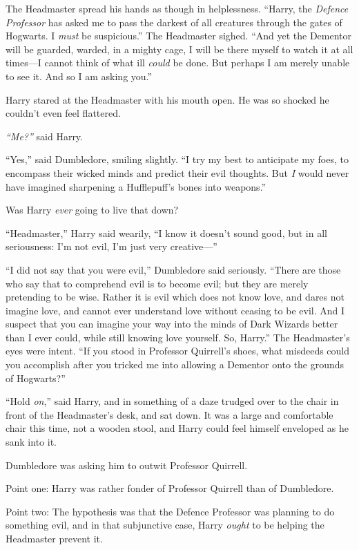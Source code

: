The Headmaster spread his hands as though in helplessness. ``Harry, the
\emph{Defence Professor} has asked me to pass the darkest of all
creatures through the gates of Hogwarts. I \emph{must} be suspicious.''
The Headmaster sighed. ``And yet the Dementor will be guarded, warded,
in a mighty cage, I will be there myself to watch it at all times---I
cannot think of what ill \emph{could} be done. But perhaps I am merely
unable to see it. And so I am asking you.''

Harry stared at the Headmaster with his mouth open. He was so shocked he
couldn't even feel flattered.

\emph{``Me?''} said Harry.

``Yes,'' said Dumbledore, smiling slightly. ``I try my best to
anticipate my foes, to encompass their wicked minds and predict their
evil thoughts. But \emph{I} would never have imagined sharpening a
Hufflepuff's bones into weapons.''

Was Harry \emph{ever} going to live that down?

``Headmaster,'' Harry said wearily, ``I know it doesn't sound good, but
in all seriousness: I'm not evil, I'm just very creative---''

``I did not say that you were evil,'' Dumbledore said seriously. ``There
are those who say that to comprehend evil is to become evil; but they
are merely pretending to be wise. Rather it is evil which does not know
love, and dares not imagine love, and cannot ever understand love
without ceasing to be evil. And I suspect that you can imagine your way
into the minds of Dark Wizards better than I ever could, while still
knowing love yourself. So, Harry.'' The Headmaster's eyes were intent.
``If you stood in Professor Quirrell's shoes, what misdeeds could you
accomplish after you tricked me into allowing a Dementor onto the
grounds of Hogwarts?''

``Hold \emph{on},'' said Harry, and in something of a daze trudged over
to the chair in front of the Headmaster's desk, and sat down. It was a
large and comfortable chair this time, not a wooden stool, and Harry
could feel himself enveloped as he sank into it.

Dumbledore was asking him to outwit Professor Quirrell.

Point one: Harry was rather fonder of Professor Quirrell than of
Dumbledore.

Point two: The hypothesis was that the Defence Professor was planning to
do something evil, and in that subjunctive case, Harry \emph{ought} to
be helping the Headmaster prevent it.

